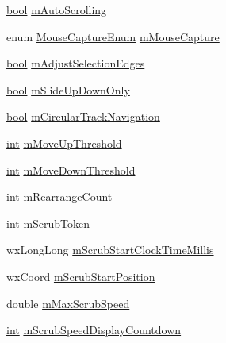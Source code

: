 \begin{DoxyCompactItemize}
\hyperlink{mac_2config_2i386_2lib-src_2libsoxr_2soxr-config_8h_abb452686968e48b67397da5f97445f5b}{bool} \hyperlink{class_track_panel_a284375ff1b505a777cd6dfad1b63040b}{m\+Auto\+Scrolling}
\item 
enum \hyperlink{class_track_panel_acdcb15e30d6e6f19b6f566d40d573e7b}{Mouse\+Capture\+Enum} \hyperlink{class_track_panel_a79906d0aaa8d91b2be89d479e78ec4e3}{m\+Mouse\+Capture}
\item 
\hyperlink{mac_2config_2i386_2lib-src_2libsoxr_2soxr-config_8h_abb452686968e48b67397da5f97445f5b}{bool} \hyperlink{class_track_panel_aaf3e6420d428eefbd10dc13f558fba06}{m\+Adjust\+Selection\+Edges}
\item 
\hyperlink{mac_2config_2i386_2lib-src_2libsoxr_2soxr-config_8h_abb452686968e48b67397da5f97445f5b}{bool} \hyperlink{class_track_panel_a02afbbe38ff6d95074c04ec433a31262}{m\+Slide\+Up\+Down\+Only}
\item 
\hyperlink{mac_2config_2i386_2lib-src_2libsoxr_2soxr-config_8h_abb452686968e48b67397da5f97445f5b}{bool} \hyperlink{class_track_panel_af02524f80a857fce1fc05853ea880e76}{m\+Circular\+Track\+Navigation}
\item 
\hyperlink{xmltok_8h_a5a0d4a5641ce434f1d23533f2b2e6653}{int} \hyperlink{class_track_panel_a45c835501dfdd9af6c72801f3bc39b1e}{m\+Move\+Up\+Threshold}
\item 
\hyperlink{xmltok_8h_a5a0d4a5641ce434f1d23533f2b2e6653}{int} \hyperlink{class_track_panel_a2fd86854de50037fe3e55b866a83df45}{m\+Move\+Down\+Threshold}
\item 
\hyperlink{xmltok_8h_a5a0d4a5641ce434f1d23533f2b2e6653}{int} \hyperlink{class_track_panel_aea9069b09b6fff4b7032754a85627331}{m\+Rearrange\+Count}
\item 
\hyperlink{xmltok_8h_a5a0d4a5641ce434f1d23533f2b2e6653}{int} \hyperlink{class_track_panel_af56e383d9608b0ee7500fbe10c5d8369}{m\+Scrub\+Token}
\item 
wx\+Long\+Long \hyperlink{class_track_panel_ae463294b215dacd0cb93f54bc360ecde}{m\+Scrub\+Start\+Clock\+Time\+Millis}
\item 
wx\+Coord \hyperlink{class_track_panel_a42bcca5177786a6bef89d3314337fa6e}{m\+Scrub\+Start\+Position}
\item 
double \hyperlink{class_track_panel_a7e5d55b49f7c2012e9157964c9d3e67f}{m\+Max\+Scrub\+Speed}
\item 
\hyperlink{xmltok_8h_a5a0d4a5641ce434f1d23533f2b2e6653}{int} \hyperlink{class_track_panel_af6bc97469446521a9213c76e533d428e}{m\+Scrub\+Speed\+Display\+Countdown}
\item 

\end{DoxyCompactItemize}
